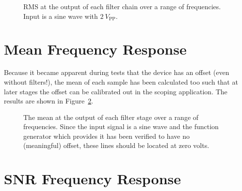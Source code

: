 \begin{figure}
    \centering
    
    \caption[RMS at Filter Chain Output]{%
        RMS  at   the  output   of  each   filter  chain   over  a   range  of
        frequencies. Input is a sine wave with $\SI{2}{V_{\mathrm{PP}}}$.%
    }
    \label{fig:verification:rmsAll}
\end{figure}


%
%
\section{Mean Frequency Response} %
\label{sec:verification:mean}

Because it  became apparent during tests  that the device has  an offset (even
without filters!), the  mean of each sample has been  calculated too such that
at later stages  the offset can be calibrated out  in the scoping application.
The results are shown in Figure~\ref{fig:verification:meanAll}.

\begin{figure}
    \centering
    
    \caption[Mean at Filter Outputs]{%
        The  mean  at  the  output  of  each filter  stage  over  a  range  of
        frequencies.  Since the  input signal is a sine wave  and the function
        generator which provides it has  been verified to have no (meaningful)
        offset, these lines should be located at zero volts.%
    }
    \label{fig:verification:meanAll}
\end{figure}
%
%
\clearpage
\section{SNR Frequency Response}%
\label{sec:verification:snr}

